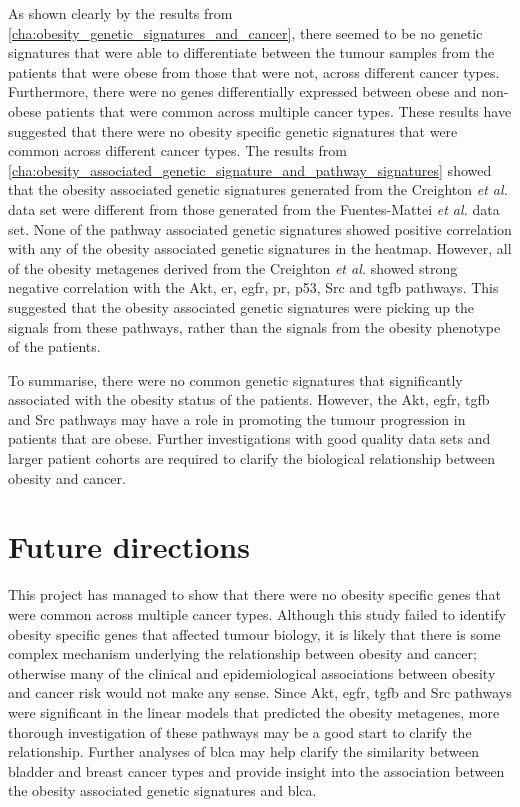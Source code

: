 As shown clearly by the results from \cref{cha:obesity_genetic_signatures_and_cancer}, there seemed to be no  genetic signatures that were able to differentiate between the tumour samples from the patients that were obese from those that were not, across different cancer types.
Furthermore, there were no genes differentially expressed between obese and non-obese patients that were common across multiple cancer types.
These results have suggested that there were no obesity specific genetic signatures that were common across different cancer types.
The results from \cref{cha:obesity_associated_genetic_signature_and_pathway_signatures} showed that the obesity associated genetic signatures generated from the Creighton \textit{et al.} data set were different from those generated from the Fuentes-Mattei \textit{et al.} data set.
None of the pathway associated genetic signatures showed positive correlation with any of the obesity associated genetic signatures in the heatmap.
However, all of the obesity metagenes derived from the Creighton \textit{et al.} showed strong negative correlation with the Akt, \gls{er}, \gls{egfr}, \gls{pr}, p53, Src and \gls{tgfb} pathways.
This suggested that the obesity associated genetic signatures were picking up the signals from these pathways, rather than the signals from the obesity phenotype of the patients.

To summarise, there were no common genetic signatures that significantly associated with the obesity status of the patients.
However, the Akt, \gls{egfr}, \gls{tgfb} and Src pathways may have a role in promoting the tumour progression in patients that are obese.
Further investigations with good quality data sets and larger patient cohorts are required to clarify the biological relationship between obesity and cancer.

\section{Future directions}
\label{sec:future_directions}

This project has managed to show that there were no obesity specific genes  that were common across multiple cancer types.
Although this study failed to identify obesity specific genes that affected tumour biology, it is likely that there is some complex mechanism underlying the relationship between obesity and cancer; otherwise many of the clinical and epidemiological associations between obesity and cancer risk would not make any sense.
Since Akt, \gls{egfr}, \gls{tgfb} and Src pathways were significant in the linear models that predicted the obesity metagenes, more thorough investigation of these pathways may be a good start to clarify the relationship.
Further analyses of \gls{blca} may help clarify the similarity between bladder and breast cancer types and provide insight into the association between the obesity associated genetic signatures and \gls{blca}.

